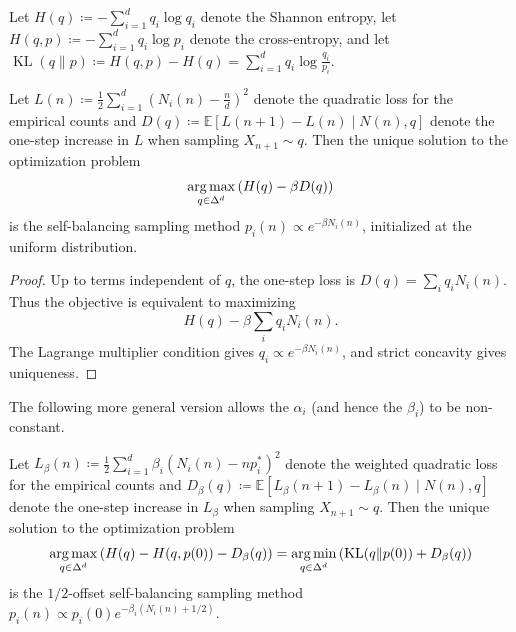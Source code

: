 Let $H(q) \coloneqq -\sum_{i=1}^d q_i \log q_i$ denote the Shannon entropy, let $H(q,p) \coloneqq - \sum_{i=1}^d q_i \log p_i$ denote the cross-entropy,
and let $\operatorname{KL}(q \| p) \coloneqq H(q,p) - H(q) = \sum_{i=1}^d q_i \log \frac{q_i}{p_i}$.

\begin{theorem} \label{thm:constant_optimization_problem}
    Let $L(n) \coloneqq \frac{1}{2} \sum_{i=1}^d (N_i(n) - \frac{n}{d})^2$ denote the quadratic loss for the empirical counts and $D(q) \coloneqq  \mathbb E[ L(n+1) - L(n) \mid N(n), q]$ denote the one-step increase in $L$ when sampling $X_{n+1} \sim q$. Then the unique solution to the optimization problem
    $$\operatorname*{arg\,max}_{q \in \Delta^d} \left(H(q) - \beta D(q)\right)$$
    is the self-balancing sampling method $p_i(n) \propto e^{-\beta N_i(n)}$, initialized at the uniform distribution.
\end{theorem}

\begin{proof}
    Up to terms independent of $q$, the one-step loss is $D(q)=\sum_i q_iN_i(n)$. Thus the objective is equivalent to maximizing
    \[H(q)-\beta\sum_i q_iN_i(n).\]
    The Lagrange multiplier condition gives $q_i\propto e^{-\beta N_i(n)}$, and strict concavity gives uniqueness.
\end{proof}


The following more general version
allows the $\alpha_i$ (and hence the $\beta_i$) to be non-constant.
\begin{theorem} \label{thm:general_optimization_problem}
    Let $L_\beta(n) \coloneqq \frac{1}{2} \sum_{i=1}^d \beta_i (N_i(n) - np_i^*)^2$ denote the weighted quadratic loss for the empirical counts and $D_\beta(q) \coloneqq  \mathbb E[ L_\beta(n+1) - L_\beta(n) \mid N(n), q]$ denote the one-step increase in $L_\beta$ when sampling $X_{n+1} \sim q$. Then the unique solution to the optimization problem
    $$\operatorname*{arg\,max}_{q \in \Delta^d} \left(H(q) - H(q,p(0)) - D_\beta(q)\right) = \operatorname*{arg\,min}_{q \in \Delta^d} \left(\operatorname{KL}(q \| p(0)) + D_\beta(q)\right)$$
    is the $1/2$-offset self-balancing sampling method $p_i(n) \propto p_i(0)e^{-\beta_i (N_i(n)+1/2)}$.
\end{theorem}

